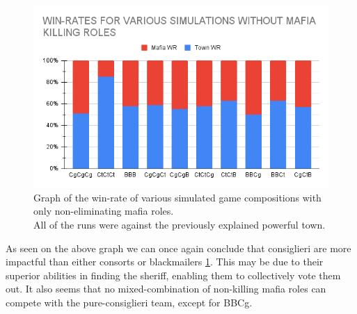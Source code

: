 \begin{figure}[H]
    \includegraphics[width=1\linewidth]{figures/Winrates_NonKilling}
    \caption{Graph of the win-rate of various 
    simulated game compositions with only 
    non-eliminating mafia roles.\\
        All of the runs were against the previously explained powerful town.}
    \label{fig:VariousSimulationsNonKilling}
\end{figure}
\vspace{-5px} As seen on the above graph we can once again conclude that
consiglieri are more impactful than either consorts or blackmailers \ref{fig:VariousSimulationsNonKilling}. This may
be due to their superior abilities in finding the sheriff, enabling them to
collectively vote them out. It also seems that no mixed-combination of
non-killing mafia roles can compete with the pure-consiglieri team, except for BBCg.
